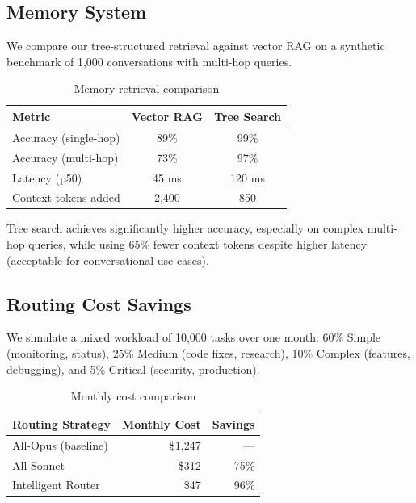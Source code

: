 \documentclass[conference]{IEEEtran}
\begin{document}
\subsection{Memory System}

We compare our tree-structured retrieval against vector RAG on a synthetic benchmark of 1,000 conversations with multi-hop queries.

\begin{table}[h]
\centering
\caption{Memory retrieval comparison}
\label{tab:retrieval}
\begin{tabular}{lcc}
\toprule
\textbf{Metric} & \textbf{Vector RAG} & \textbf{Tree Search} \\
\midrule
Accuracy (single-hop) & 89\% & 99\% \\
Accuracy (multi-hop) & 73\% & 97\% \\
Latency (p50) & 45 ms & 120 ms \\
Context tokens added & 2,400 & 850 \\
\bottomrule
\end{tabular}
\end{table}

Tree search achieves significantly higher accuracy, especially on complex multi-hop queries, while using 65\% fewer context tokens despite higher latency (acceptable for conversational use cases).

\subsection{Routing Cost Savings}

We simulate a mixed workload of 10,000 tasks over one month: 60\% Simple (monitoring, status), 25\% Medium (code fixes, research), 10\% Complex (features, debugging), and 5\% Critical (security, production).

\begin{table}[h]
\centering
\caption{Monthly cost comparison}
\label{tab:cost_savings}
\begin{tabular}{lrr}
\toprule
\textbf{Routing Strategy} & \textbf{Monthly Cost} & \textbf{Savings} \\
\midrule
All-Opus (baseline) & \$1,247 & --- \\
All-Sonnet & \$312 & 75\% \\
Intelligent Router & \$47 & 96\% \\
\bottomrule
\end{tabular}
\end{table}
\end{document}
